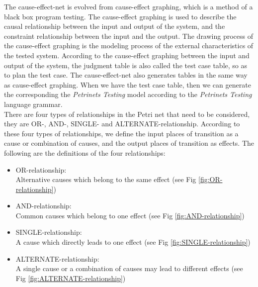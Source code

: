 The cause-effect-net is evolved from cause-effect graphing, which is a method of a black box program testing. The cause-effect graphing \cite{srivastava2009cause} is used to describe the causal relationship between the input and output of the system, and the constraint relationship between the input and the output. The drawing process of the cause-effect graphing is the modeling process of the external characteristics of the tested system. According to the cause-effect graphing between the input and output of the system, the judgment table is also called the test case table, so as to plan the test case. The cause-effect-net also generates tables in the same way as cause-effect graphing. When we have the test case table, then we can generate the corresponding the \emph{Petrinets Testing} model according to the \emph{Petrinets Testing} language grammar. \\

There are four types of relationships in the Petri net that need to be considered, they are OR-, AND-, SINGLE- and ALTERNATE-relationship. According to these four types of relationships, we define the input places of transition as a cause or combination of causes, and the output places of transition as effects. The following are the definitions of the four relationships:

\begin{itemize}
    \item OR-relationship: \\ 
        Alternative causes which belong to the same effect (see Fig \ref{fig:OR-relationship})
    \item AND-relationship: \\ 
        Common causes which belong to one effect (see Fig \ref{fig:AND-relationship})
    \item SINGLE-relationship: \\ 
        A cause which directly leads to one effect (see Fig \ref{fig:SINGLE-relationship})
    \item ALTERNATE-relationship: \\
        A single cause or a combination of causes may lead to different effects (see Fig \ref{fig:ALTERNATE-relationship})
\end{itemize}

